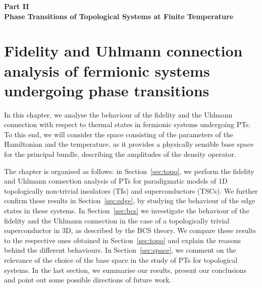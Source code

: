 %
%
%
%
%
%
%


\begin{center}
\begin{Huge}
\textbf{Part II\\ \vspace{\baselineskip}Phase Transitions of Topological Systems at Finite Temperature}\end{Huge}
\end{center}
\newpage


\chapter{Fidelity and Uhlmann connection analysis of fermionic systems undergoing phase transitions}

In this chapter, we analyse the behaviour of the fidelity and the Uhlmann connection with respect to thermal states in fermionic systems undergoing PTs. To this end, we will consider the space consisting of the parameters of the Hamiltonian and the temperature, as it provides a physically sensible base space for the principal bundle, describing the amplitudes of the density operator.

The chapter is organised as follows: in Section~\ref{sec:topo}, we perform the fidelity and Uhlmann connection analysis of PTs for paradigmatic models of 1D topologically non-trivial insulators (TIs) and superconductors (TSCs). We further confirm these results in Section~\ref{sec:edge}, by studying the behaviour of the edge states in these systems. In Section~\ref{sec:bcs} we investigate the behaviour of the fidelity and the Uhlmann connection in the case of a topologically trivial superconductor in 3D, as described by the BCS theory. We compare these results to the respective ones obtained in Section~\ref{sec:topo} and explain the reasons behind the different behaviours. In Section~\ref{sec:space}, we comment on the relevance of the choice of the base space in the study of PTs for topological systems.  In the last section, we summarise our results, present our conclusions and point out some possible directions of future work.


